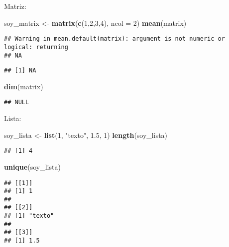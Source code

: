 \documentclass[]{book}
\newenvironment{Shaded}{\begin{snugshade}}{\end{snugshade}}
\newcommand{\DataTypeTok}[1]{\textcolor[rgb]{0.13,0.29,0.53}{#1}}
\newcommand{\DecValTok}[1]{\textcolor[rgb]{0.00,0.00,0.81}{#1}}
\newcommand{\FloatTok}[1]{\textcolor[rgb]{0.00,0.00,0.81}{#1}}
\newcommand{\KeywordTok}[1]{\textcolor[rgb]{0.13,0.29,0.53}{\textbf{#1}}}
\newcommand{\NormalTok}[1]{#1}
\newcommand{\StringTok}[1]{\textcolor[rgb]{0.31,0.60,0.02}{#1}}
\begin{document}
Matriz:

\begin{Shaded}
\begin{Highlighting}[]
\NormalTok{soy_matrix <-}\StringTok{ }\KeywordTok{matrix}\NormalTok{(}\KeywordTok{c}\NormalTok{(}\DecValTok{1}\NormalTok{,}\DecValTok{2}\NormalTok{,}\DecValTok{3}\NormalTok{,}\DecValTok{4}\NormalTok{), }\DataTypeTok{ncol =} \DecValTok{2}\NormalTok{)}
\KeywordTok{mean}\NormalTok{(matrix)}
\end{Highlighting}
\end{Shaded}

\begin{verbatim}
## Warning in mean.default(matrix): argument is not numeric or logical: returning
## NA
\end{verbatim}

\begin{verbatim}
## [1] NA
\end{verbatim}

\begin{Shaded}
\begin{Highlighting}[]
\KeywordTok{dim}\NormalTok{(matrix)}
\end{Highlighting}
\end{Shaded}

\begin{verbatim}
## NULL
\end{verbatim}

Lista:

\begin{Shaded}
\begin{Highlighting}[]
\NormalTok{soy_lista <-}\StringTok{ }\KeywordTok{list}\NormalTok{(}\DecValTok{1}\NormalTok{, }\StringTok{"texto"}\NormalTok{, }\FloatTok{1.5}\NormalTok{, }\DecValTok{1}\NormalTok{)}
\KeywordTok{length}\NormalTok{(soy_lista)}
\end{Highlighting}
\end{Shaded}

\begin{verbatim}
## [1] 4
\end{verbatim}

\begin{Shaded}
\begin{Highlighting}[]
\KeywordTok{unique}\NormalTok{(soy_lista)}
\end{Highlighting}
\end{Shaded}

\begin{verbatim}
## [[1]]
## [1] 1
## 
## [[2]]
## [1] "texto"
## 
## [[3]]
## [1] 1.5
\end{verbatim}
\end{document}
